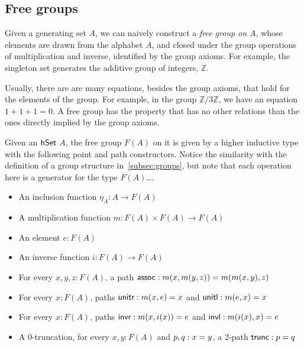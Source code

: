 \subsection{Free groups}

Given a generating set $A$, we can naively construct a \emph{free group on $A$},
whose elements are drawn from the alphabet $A$, and closed under the group
operations of multiplication and inverse, identified by the group axioms.
For example, the singleton set generates the additive group of integers,
$\mathbb{Z}$.

Usually, there are are many equations, besides the group axioms, that hold for
the elements of the group. For example, in the group $\mathbb{Z}/3\mathbb{Z}$,
we have an equation $1 + 1 + 1 = 0$. A free group has the property that has no
other relations than the ones directly implied by the group axioms.

\begin{definition}
  Given an $\mathsf{hSet}$ $A$, the free group $F(A)$ on it is given by a higher
  inductive type with the following point and path constructors. Notice the
  similarity with the definition of a group structure in~\ref{subsec:groups},
  but note that each operation here is a generator for the type $F(A)$\dots.
  \begin{itemize}
    \item An inclusion function $\eta_{A} : A \to F(A)$
    \item A multiplication function $m : F(A) \times F(A) \to F(A)$
    \item An element $e : F(A)$
    \item An inverse function $i : F(A) \to F(A)$
  \end{itemize}
  \smallskip
  \begin{itemize}
    \item For every $x, y, z : F(A)$, a path $\term{assoc} : m(x, m(y, z)) \id m(m(x, y), z)$
    \item For every $x : F(A)$, paths $\term{unitr} : m(x, e) \id x$ and $\term{unitl} : m(e, x) \id x$
    \item For every $x : F(A)$, paths $\term{invr} : m(x, i(x)) \id e$ and $\term{invl} : m(i(x), x) \id e$
    \item A 0-truncation, for every $x, y : F(A)$ and $p, q : x \id y$, a 2-path $\term{trunc} : p \id q$
  \end{itemize}
\end{definition}

